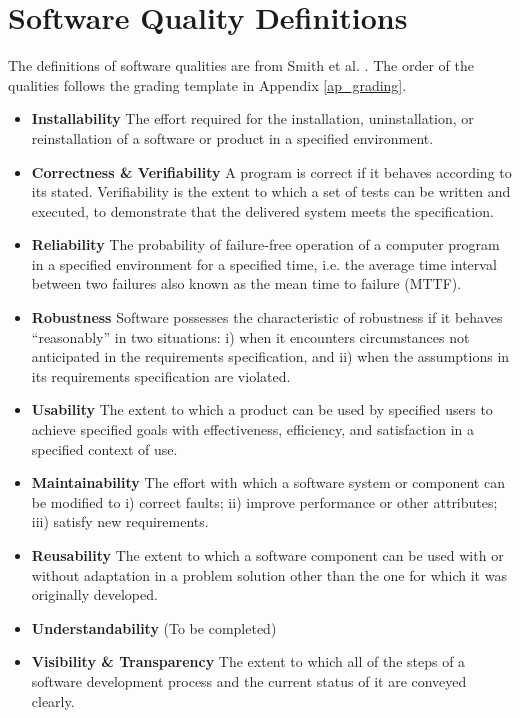 \section{Software Quality Definitions}

The definitions of software qualities are from Smith et al. \cite{SmithEtAl2020}. The order of the qualities follows the grading template in Appendix \ref{ap_grading}.

\begin{itemize}
\item \textbf{Installability} The effort required for the installation, uninstallation, or reinstallation of a software or product in a specified environment.
\item \textbf{Correctness \& Verifiability} A program is correct if it behaves according to its stated. Verifiability is the extent to which a set of tests can be written and executed, to demonstrate that the delivered system meets the specification.
\item \textbf{Reliability} The probability of failure-free operation of a computer program in a specified environment for a specified time, i.e. the average time interval between two failures also known as the mean time to failure (MTTF).
\item \textbf{Robustness} Software possesses the characteristic of robustness if it behaves ``reasonably'' in two situations: i) when it encounters circumstances not anticipated in the requirements specification, and ii) when the assumptions in its requirements specification are violated.
\item \textbf{Usability} The extent to which a product can be used by specified users to achieve specified goals with effectiveness, efficiency, and satisfaction in a specified context of use.
\item \textbf{Maintainability} The effort with which a software system or component can be modified to i) correct faults; ii) improve performance or other attributes; iii) satisfy new requirements.
\item \textbf{Reusability} The extent to which a software component can be used with or without adaptation in a problem solution other than the one for which it was originally developed.
\item \textbf{Understandability} (To be completed)
\item \textbf{Visibility \& Transparency} The extent to which all of the steps of a software development process and the current status of it are conveyed clearly.
\end{itemize}

